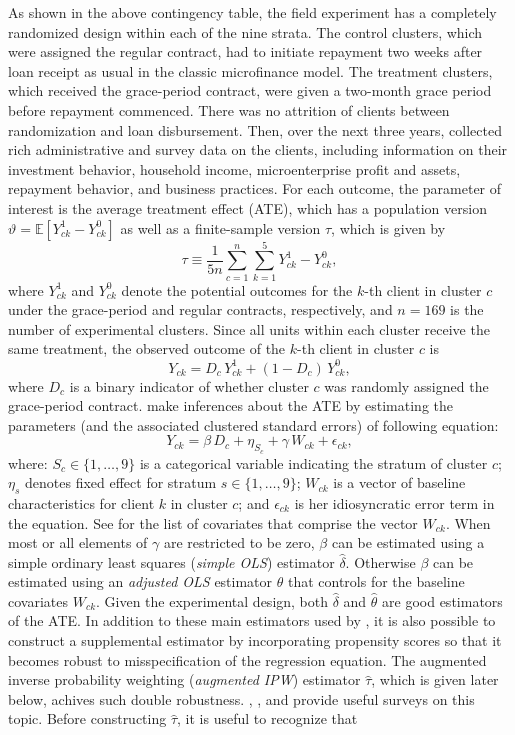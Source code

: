 \documentclass[12pt]{article}
\begin{document}
As shown in the above contingency table, the field experiment has a completely randomized design within each of the nine strata. The control clusters, which were assigned the regular contract, had to initiate repayment two weeks after loan receipt as usual in the classic microfinance model. The treatment clusters, which received the grace-period contract, were given a two-month grace period before repayment commenced. There was no attrition of clients between randomization and loan disbursement. Then, over the next three years, \cite{field2013does} collected rich administrative and survey data on the clients, including information on their investment behavior, household income, microenterprise profit and assets, repayment behavior, and business practices. For each outcome, the parameter of interest is the average treatment effect (ATE), which has a population version $\vartheta = \mathbb{E}[Y^1_{ck} - Y^0_{ck}]$ as well as a finite-sample version $\tau$, which is given by
$$\tau \equiv \frac{1}{5n}\sum_{c = 1}^n \sum_{k = 1}^5 Y^1_{ck} - Y^0_{ck},$$
where $Y^1_{ck}$ and $Y^0_{ck}$ denote the potential outcomes for the $k$-th client in cluster $c$ under the grace-period and regular contracts, respectively, and $n = 169$ is the number of experimental clusters. Since all units within each cluster receive the same treatment, the observed outcome of the $k$-th client in cluster $c$ is $$Y_{ck} = D_c\,Y^1_{ck} + (1 - D_c)\,Y^0_{ck},$$ where $D_c$ is a binary indicator of whether cluster $c$ was randomly assigned the grace-period contract. \cite{field2013does} make inferences about the ATE by estimating the parameters (and the associated clustered standard errors) of following equation:
$$Y_{ck} = \beta\,D_c + \eta_{S_c} + \gamma\,W_{ck} + \epsilon_{ck},$$
where: $S_c \in \{1,\dots,9\}$ is a categorical variable indicating the stratum of cluster $c$; $\eta_{s}$ denotes fixed effect for stratum $s \in \{1,\dots,9\}$; $W_{ck}$ is a vector of baseline characteristics for client $k$ in cluster $c$; and $\epsilon_{ck}$ is her idiosyncratic error term in the equation. See \cite{field2013does} for the list of covariates that comprise the vector $W_{ck}$. When most or all elements of $\gamma$ are restricted to be zero, $\beta$ can be estimated using a simple ordinary least squares (\textit{simple OLS}) estimator $\widehat{\delta}$. Otherwise $\beta$ can be estimated using an \textit{adjusted OLS} estimator $\widehat{\theta}$ that controls for the baseline covariates $W_{ck}$. Given the experimental design, both $\widehat{\delta}$ and $\widehat{\theta}$ are good estimators of the ATE. In addition to these main estimators used by \cite{field2013does}, it is also possible to construct a supplemental estimator by incorporating propensity scores so that it becomes robust to misspecification of the regression equation. The augmented inverse probability weighting (\textit{augmented IPW}) estimator $\widehat{\tau}$, which is given later below, achives such double robustness. \cite{ding2018causal}, \cite{athey2017estimating}, and \cite{lunceford2004stratification} provide useful surveys on this topic. Before constructing $\widehat{\tau}$, it is useful to recognize that
\end{document}
